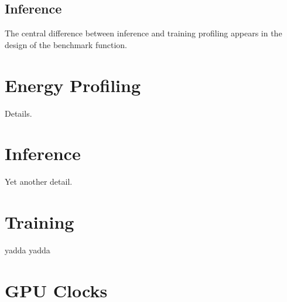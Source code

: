 \subsection{Inference}
The central difference between inference and training profiling appears in the design of the benchmark function. \\



\section{Energy Profiling}

Details.

\section{Inference}

Yet another detail.

\section{Training}

yadda yadda

\section{GPU Clocks}